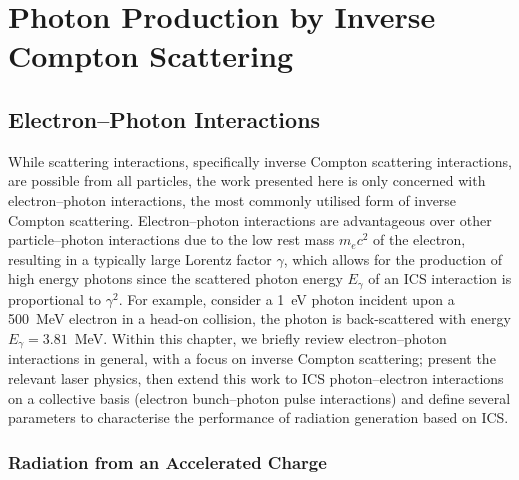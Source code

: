 \documentclass[../main.tex]{subfiles}
\begin{document}
\chapter{Photon Production by Inverse Compton Scattering}
\label{Photon_Production_by_Inverse_Compton_Scattering} %

\section{Electron--Photon Interactions}
\label{sec:electron_photon_interactions}

While scattering interactions, specifically inverse Compton scattering interactions, are possible from all particles, the work presented here is only concerned with electron--photon interactions, the most commonly utilised form of inverse Compton scattering.  Electron--photon interactions are advantageous over other particle--photon interactions due to the low rest mass $m_{e}c^{2}$ of the electron, resulting in a typically large Lorentz factor $\gamma$, which allows for the production of high energy photons since the scattered photon energy $E_{\gamma}$ of an ICS interaction is proportional to $\gamma^{2}$. For example, consider a 1~\si{\electronvolt} photon incident upon a 500~\si{\mega\electronvolt} electron in a head-on collision, the photon is back-scattered with energy $E_{\gamma} = 3.81$~\si{\mega\electronvolt}. Within this chapter, we briefly review electron--photon interactions in general, with a focus on inverse Compton scattering; present the relevant laser physics, then extend this work to ICS photon--electron interactions on a collective basis (electron bunch--photon pulse interactions) and define several parameters to characterise the performance of radiation generation based on ICS.   

\subsection{Radiation from an Accelerated Charge}
\label{sec:radiation_accelerated_charge}
\end{document}
